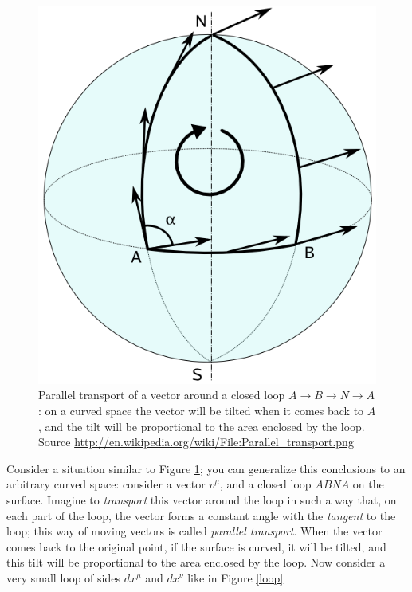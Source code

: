 \documentclass[11pt, a4paper,oneside,openright]{book}
\numberwithin{equation}{section}
\begin{document}
\begin{figure}
\begin{center}
\includegraphics[scale=0.5]{Draw/Parallel_transport.png}
\end{center}
\caption{Parallel transport of a vector around a closed loop $A\rightarrow B\rightarrow N \rightarrow A$: on a curved space the vector will be tilted when it comes back to $A$, and the tilt will be proportional to the area enclosed by the loop. Source \url{http://en.wikipedia.org/wiki/File:Parallel_transport.png}}
\label{transport}
\end{figure}
Consider a situation similar to Figure \ref{transport}; you can generalize this conclusions to an arbitrary curved space: consider a vector $v^\mu$, and a closed loop $ABNA$ on the surface. Imagine to \textit{transport} this vector around the loop in such a way that, on each part of the loop, the vector forms a constant angle with the \textit{tangent} to the loop; this way of moving vectors is called \textit{parallel transport}. When the vector comes back to the original point, if the surface is curved, it will be tilted, and this tilt will be proportional to the area enclosed by the loop. Now consider a very small loop of sides $dx^\mu$ and $dx^\nu$ like in Figure \ref{loop}
\end{document}

